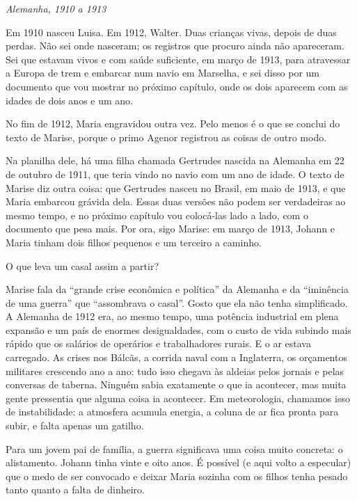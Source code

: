 \documentclass[
  brazilian,
  11pt,
  openany]{book}
\begin{document}
\emph{Alemanha, 1910 a 1913}

Em 1910 nasceu Luisa. Em 1912, Walter. Duas crianças vivas, depois de
duas perdas. Não sei onde nasceram; os registros que procuro ainda não
apareceram. Sei que estavam vivos e com saúde suficiente, em março de
1913, para atravessar a Europa de trem e embarcar num navio em Marselha,
e sei disso por um documento que vou mostrar no próximo capítulo, onde
os dois aparecem com as idades de dois anos e um ano.

No fim de 1912, Maria engravidou outra vez. Pelo menos é o que se
conclui do texto de Marise, porque o primo Agenor registrou as coisas de
outro modo.

Na planilha dele, há uma filha chamada Gertrudes nascida na Alemanha em
22 de outubro de 1911, que teria vindo no navio com um ano de idade. O
texto de Marise diz outra coisa: que Gertrudes nasceu no Brasil, em maio
de 1913, e que Maria embarcou grávida dela. Essas duas versões não podem
ser verdadeiras ao mesmo tempo, e no próximo capítulo vou colocá-las
lado a lado, com o documento que pesa mais. Por ora, sigo Marise: em
março de 1913, Johann e Maria tinham dois filhos pequenos e um terceiro
a caminho.

O que leva um casal assim a partir?

Marise fala da ``grande crise econômica e política'' da Alemanha e da
``iminência de uma guerra'' que ``assombrava o casal''. Gosto que ela
não tenha simplificado. A Alemanha de 1912 era, ao mesmo tempo, uma
potência industrial em plena expansão e um país de enormes
desigualdades, com o custo de vida subindo mais rápido que os salários
de operários e trabalhadores rurais. E o ar estava carregado. As crises
nos Bálcãs, a corrida naval com a Inglaterra, os orçamentos militares
crescendo ano a ano: tudo isso chegava às aldeias pelos jornais e pelas
conversas de taberna. Ninguém sabia exatamente o que ia acontecer, mas
muita gente pressentia que alguma coisa ia acontecer. Em meteorologia,
chamamos isso de instabilidade: a atmosfera acumula energia, a coluna de
ar fica pronta para subir, e falta apenas um gatilho.

Para um jovem pai de família, a guerra significava uma coisa muito
concreta: o alistamento. Johann tinha vinte e oito anos. É possível (e
aqui volto a especular) que o medo de ser convocado e deixar Maria
sozinha com os filhos tenha pesado tanto quanto a falta de dinheiro.
\end{document}
